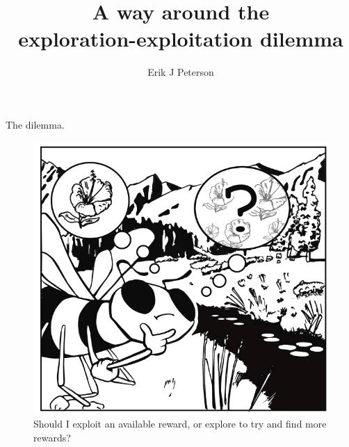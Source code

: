 \documentclass[10pt]{beamer}
\title{A way around the\\exploration-exploitation dilemma}
\date{}
\author{Erik J Peterson}
\institute{Research fellow | CoAxLab\\
Carnegie Mellon University\\
\url{robotpuggle.com}}
\begin{document}
\maketitle


    

\begin{frame}[fragile]{The dilemma.}
\begin{figure}
    \centering
    \includegraphics[scale=0.8]{images/left_bee.png} 
    \caption{Should I exploit an available reward, or explore to try and find more rewards?}
\end{figure}
\end{frame}
\end{document}
